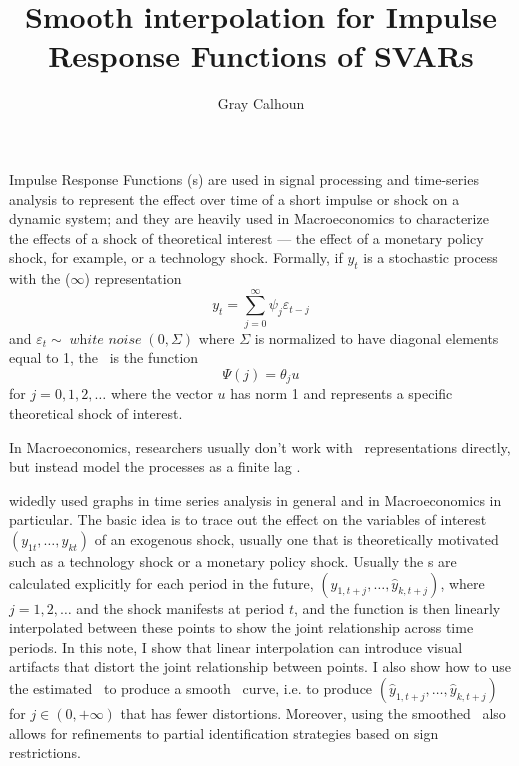 \documentclass[12pt,fleqn]{article}
\title{Smooth interpolation for Impulse Response Functions of SVARs}
\author{Gray Calhoun}
\DeclareMathOperator{\whitenoise}{\mathit{white\ noise}}
\newcommand{\vep}{\varepsilon}
\begin{document}
\maketitle

Impulse Response Functions (\IRF s) are used in signal processing and
time-series analysis to represent the effect over time of a short
impulse or shock on a dynamic system; and they are heavily used in
Macroeconomics to characterize the effects of a shock of theoretical
interest --- the effect of a monetary policy shock, for example, or a
technology shock. Formally, if $y_t$ is a stochastic process with the
\MA($\infty$) representation
\begin{equation*}
  y_t = \sum_{j=0}^{\infty} \psi_j \vep_{t-j}
\end{equation*}
and $\vep_t \sim \whitenoise(0,\Sigma)$ where $\Sigma$ is normalized
to have diagonal elements equal to 1, the \IRF\ is the function
\begin{equation*}
  \Psi(j) = \theta_j u
\end{equation*}
for $j = 0, 1, 2,\dots$ where the vector $u$ has norm 1 and represents
a specific theoretical shock of interest.

In Macroeconomics, researchers usually don't work with \MA\
representations directly, but instead model the processes as a finite
lag \VAR.

widedly used graphs in time
series analysis in general and in Macroeconomics in particular. The
basic idea is to trace out the effect on the variables of interest
$(y_{1t},\dots,y_{kt})$ of an exogenous shock, usually one that is
theoretically motivated such as a technology shock or a monetary
policy shock. Usually the \IRF s are calculated explicitly for each
period in the future, $(\hat y_{1,t+j},\dots,\hat y_{k,t+j})$, where
$j = 1, 2, \dots$ and the shock manifests at period $t$, and the
function is then linearly interpolated between these points to show
the joint relationship across time periods. In this note, I show that
linear interpolation can introduce visual artifacts that distort the
joint relationship between points. I also show how to use the
estimated \VAR\ to produce a smooth \IRF\ curve, i.e. to produce
$(\hat y_{1,t+j},\dots,\hat y_{k,t+j})$ for $j \in (0,+\infty)$ that
has fewer distortions. Moreover, using the smoothed \IRF\ also allows
for refinements to partial identification strategies based on sign
restrictions.
\end{document}
